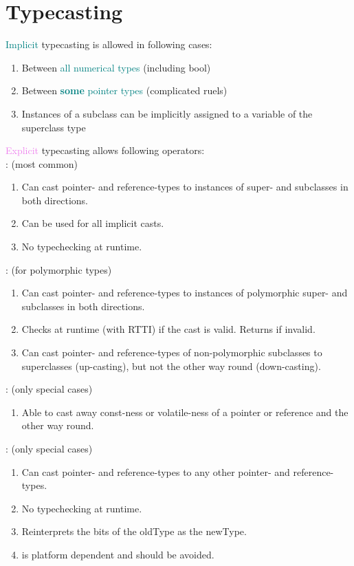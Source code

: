\section{Typecasting}
    \textcolor{teal}{Implicit} typecasting is allowed in following cases:
    \begin{enumerate}
        \item Between \textcolor{teal}{all numerical types} (including bool)
        \item Between \textcolor{teal}{\textbf{some} pointer types} (complicated ruels)
        \item Instances of a subclass can be implicitly assigned to a variable of the superclass type 
    \end{enumerate}
    \textcolor{violet}{Explicit} typecasting allows following operators:\vspace{1mm}\\
    : (most common)
    \begin{enumerate}
        \item Can cast pointer- and reference-types to instances of super- and subclasses in both directions.
        \item Can be used for all implicit casts.
        \item No typechecking at runtime.
    \end{enumerate}
    : (for polymorphic types)
    \begin{enumerate}
        \item Can cast pointer- and reference-types to instances of polymorphic super- and subclasses in both directions.
        \item Checks at runtime (with RTTI) if the cast is valid. Returns  if invalid.
        \item Can cast pointer- and reference-types of non-polymorphic subclasses to superclasses (up-casting), but not the other way round (down-casting).
    \end{enumerate}
    : (only special cases)
    \begin{enumerate}
        \item Able to cast away const-ness or volatile-ness of a pointer or reference and the other way round.
    \end{enumerate}
    : (only special cases)
    \begin{enumerate}
        \item Can cast pointer- and reference-types to any other pointer- and reference-types.
        \item No typechecking at runtime.
        \item Reinterprets the bits of the oldType as the newType.
        \item {} is platform dependent and should be avoided.
    \end{enumerate}

